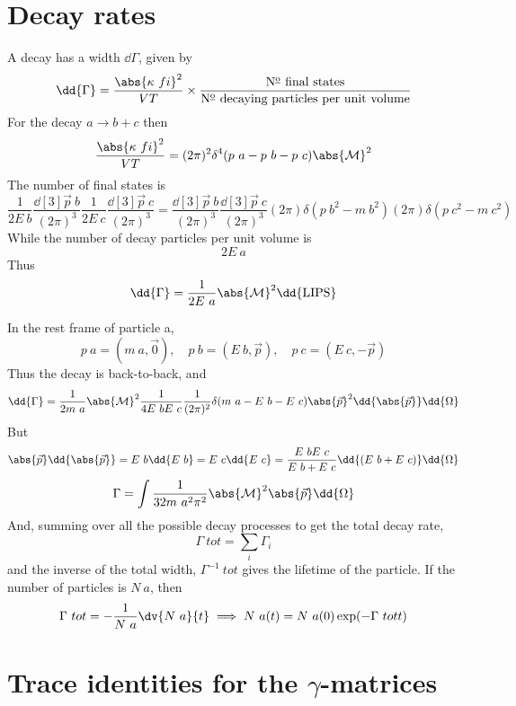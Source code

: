 \section{Decay rates}
\label{sec:decay-rates}

A decay has a width $\dd{\Gamma}$, given by
\[ \dd{\Gamma} = \frac{\abs{\kappa~{fi}}^2}{VT} \times \frac{\text{{N$^{{\text{\underline{o}}}}$ final states}}}{\text{{N$^{{\text{\underline{o}}}}$ decaying particles per unit volume}}}\]
For the decay $a \to b+c$ then
\[ \frac{\abs{\kappa~{fi}}^2}{VT} = (2 \pi)^2 \delta^4(p~a - p~b - p~c) \abs{\mathcal{M}}^2 \]
The number of final states is
\[ \frac{1}{2E~b} \frac{\dd[3]{\vec{p}~b}}{(2 \pi)^3} \frac{1}{2E~c} \frac{\dd[3]{\vec{p}~c}}{(2 \pi)^3} 
= \frac{\dd[3]{\vec{p}~b}}{(2 \pi)^3} \frac{\dd[3]{\vec{p}~c}}{(2 \pi)^3} (2 \pi) \delta(p~b^2-m~b^2) (2 \pi) \delta(p~c^2 - m~c^2) \]
While the number of decay particles per unit volume is 
\[ 2E~a \]
Thus
\begin{equation}
  \dd{\Gamma} = \frac{1}{2E~a} \abs{\mathcal{M}}^2 \dd{\text{LIPS}}
\end{equation}

In the rest frame of particle a, 
\[ p~a = (m~a,\vec{0}), \quad p~b = (E~b, \vec{p}), \quad p~c = (E~c, -\vec{p}) \]
Thus the decay is back-to-back, and 
\[ \dd{\Gamma} = \frac{1}{2m~a} \abs{\mathcal{M}}^2 \frac{1}{4 E~b E~c} \frac{1}{(2 \pi)^2} \delta(m~a - E~b -E~c) \abs{\vec{p}}^2 \dd{\abs{\vec{p}}} \dd{\Omega} \]
But
\[ \abs{\vec{p}} \dd{\abs{\vec{p}}} = E~b \dd{E~b} = E~c \dd{E~c} = \frac{E~b E~c}{E~b + E~c} \dd{(E~b + E~c)} \dd{\Omega} \] 
\begin{equation}
  \Gamma = \int \frac{1}{32 m~a^2 \pi^2} \abs{\mathcal{M}}^2 \abs{\vec{p}} \dd{\Omega}
\end{equation}
And, summing over all the possible decay processes to get the total decay rate,
\[ \Gamma~{tot} = \sum_i \Gamma_i \]
and the inverse of the total width, $\Gamma^{-1}~{tot}$ gives the
lifetime of the particle. If the number of particles is $N~a$, then
\[ \Gamma~{tot} = - \frac{1}{N~a} \dv{N~a}{t} \implies N~a(t) = N~a(0) \exp(- \Gamma~{tot} t) \]
 
\section{Trace identities for the $\gamma$-matrices}
\label{sec:trace-ident-gamma}

